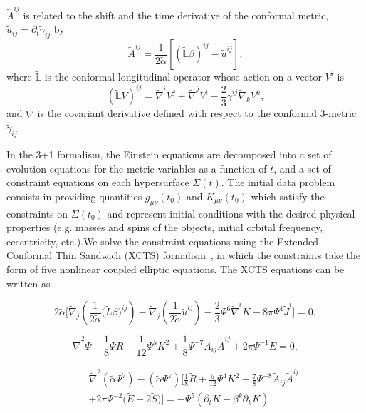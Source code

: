 $\tilde{A}^{ij}$ is related to the shift and the time derivative of the conformal
metric, $\tilde{u}_{ij}=\partial_t\tilde{\gamma}_{ij}$ by
\begin{equation}
\tilde{A}^{ij} =
\frac{1}{2\tilde{\alpha}}\left[\left(\tilde{\mathbb{L}}\beta\right)^{ij}-\tilde{u}^{ij}\right],
\end{equation}
where $\tilde{\mathbb{L}}$ is the conformal longitudinal operator whose action on a vector $V^i$ is
\begin{equation}
\left(\tilde{\mathbb{L}}V\right)^{ij} = \tilde{\nabla}^iV^j +
\tilde{\nabla}^jV^i -
\frac{2}{3}\tilde{\gamma}^{ij}\tilde{\nabla}_kV^k,
\end{equation}
and $\tilde{\nabla}$ is the covariant derivative defined with respect to 
the conformal 3-metric $\tilde \gamma_{ij}$.

In the 3+1 formalism, the Einstein equations are decomposed into a set
of evolution equations for the metric variables as a function of $t$,
and a set of constraint equations on each hypersurface
$\Sigma(t)$. The initial data problem consists in providing quantities
$g_{\mu \nu}(t_0)$ and $K_{\mu \nu}(t_0)$ which satisfy the
constraints on $\Sigma(t_0)$ and represent initial conditions with the
desired physical properties (e.g. masses and spins of the objects,
initial orbital frequency, eccentricity, etc.).We solve the constraint
equations using the Extended Conformal Thin Sandwich (XCTS)
formalism~\citep{York1999}, in which the constraints take the form of
five nonlinear coupled elliptic equations. The XCTS equations can be
written as

\begin{equation}
2\tilde{\alpha}\bigg[\tilde{\nabla}_j\left(\frac{1}{2\tilde{\alpha}}\big(\tilde{L}\beta\big)^{ij}\right)-\tilde{\nabla}_j\left(\frac{1}{2\tilde{\alpha}}\tilde{u}^{ij}\right)
\label{eq:XCTS-Shift}
-\frac{2}{3}\Psi^6\tilde{\nabla}^iK-8\pi\Psi^4\tilde{J}^i\bigg]=0,
\end{equation}

\begin{equation}
\tilde{\nabla}^2\Psi - \frac{1}{8}\Psi\tilde{R} -
\frac{1}{12}\Psi^5K^2
\label{eq:XCTS-ConformalFactor}
+\frac{1}{8}\Psi^{-7}\tilde{A}_{ij}\tilde{A}^{ij} +
2\pi\Psi^{-1}\tilde{E}= 0,
\end{equation}

\begin{eqnarray}
&&\tilde{\nabla}^2\left(\tilde{\alpha}\Psi^7\right) -
\left(\tilde{\alpha}\Psi^7\right)\bigg[\frac{1}{8}\tilde{R}+\frac{5}{12}\Psi^4K^2+\frac{7}{8}\Psi^{-8}\tilde{A}_{ij}\tilde{A}^{ij}\nonumber \\
\label{eq:XCTS-Lapse}
&&+2\pi\Psi^{-2}\big(\tilde{E}+2\tilde{S}\big)\bigg]=-\Psi^5\left(\partial_{t}K
- \beta^{k}\partial_kK\right).
\end{eqnarray}

